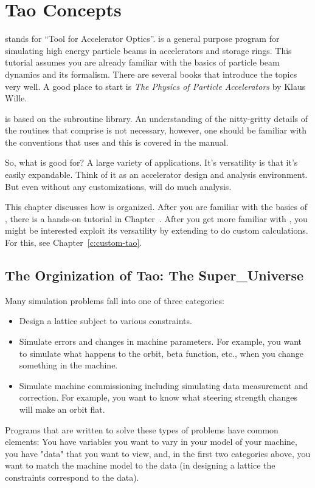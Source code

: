 \chapter{Tao Concepts}
\label{c:concepts}

\tao stands for ``Tool for Accelerator Optics''. \tao is a general
purpose program for simulating high energy particle beams in
accelerators and storage rings. This tutorial assumes you are already
familiar with the basics of particle beam dynamics and its
formalism. There are several books that introduce the topics very
well. A good place to start is \textit{The Physics of Particle
Accelerators} by Klaus Wille.

\tao is based on the \bmad\cite{b:bmad} subroutine library. An
understanding of the nitty-gritty details of the routines that
comprise \bmad is not necessary, however, one should be familiar with
the conventions that \bmad uses and this is covered in the \bmad
manual.

So, what is \tao good for? A large variety of applications. It's
versatility is that it's easily expandable. Think of it as an
accelerator design and analysis environment. But even without any
customizations, \tao will do much analysis. 

This chapter discusses how \tao is organized. After you are familiar
with the basics of \tao, there is a hands-on tutorial in
Chapter~. After you get more familiar with \tao, you
might be interested exploit its versatility by extending \tao to do
custom calculations. For this, see Chapter~\ref{c:custom-tao}.

\section{The Orginization of Tao: The Super\_Universe}
\label{s:orginization}

Many simulation problems fall into one of three categories: 
\begin{itemize}
\item 
Design a lattice subject to various constraints.
\item
Simulate errors and changes in machine parameters. For example, you want to
simulate what happens to the orbit, beta function, etc., when you change
something in the machine. 
\item 
Simulate machine commissioning including simulating data measurement and
correction. For example, you want to know what steering strength changes will
make an orbit flat.
\end{itemize}
Programs that are written to solve these types of problems have common
elements: You have variables you want to vary in your model of your
machine, you have "data" that you want to view, and, in the first two
categories above, you want to match the machine model to the data (in
designing a lattice the constraints correspond to the data).

